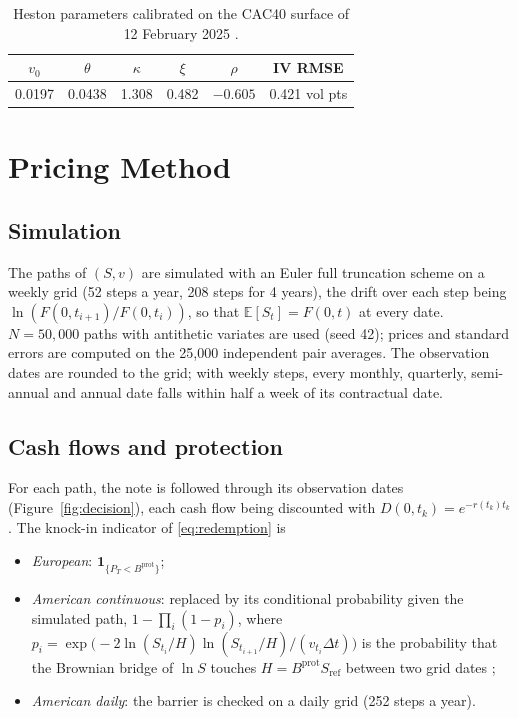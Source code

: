 \documentclass[11pt,a4paper]{article}
\newcommand{\E}{\mathbb{E}}
\newcommand{\ind}{\mathbf{1}}
\newcommand{\Sref}{S_{\mathrm{ref}}}
\begin{document}
\begin{table}[h]
\centering
\begin{tabular}{@{}cccccc@{}}
\toprule
$v_0$ & $\theta$ & $\kappa$ & $\xi$ & $\rho$ & IV RMSE \\
\midrule
0.0197 & 0.0438 & 1.308 & 0.482 & $-0.605$ & 0.421 vol pts \\
\bottomrule
\end{tabular}
\caption{Heston parameters calibrated on the CAC40 surface of 12 February 2025 \cite{benguedda2026heston}.}
\label{tab:heston}
\end{table}

\section{Pricing Method}\label{sec:method}

\subsection{Simulation}
The paths of $(S, v)$ are simulated with an Euler full truncation scheme on a weekly grid (52 steps a year,
208 steps for 4 years), the drift over each step being $\ln(F(0,t_{i+1})/F(0,t_i))$, so that
$\E[S_t] = F(0,t)$ at every date. $N = 50{,}000$ paths with antithetic variates are used (seed 42); prices and
standard errors are computed on the 25{,}000 independent pair averages. The observation dates are rounded to the
grid; with weekly steps, every monthly, quarterly, semi-annual and annual date falls within half a week of its
contractual date.

\subsection{Cash flows and protection}
For each path, the note is followed through its observation dates (Figure~\ref{fig:decision}), each cash flow
being discounted with $D(0,t_k) = e^{-r(t_k) t_k}$. The knock-in indicator of \eqref{eq:redemption} is
\begin{itemize}
\item \emph{European}: $\ind_{\{P_T < B^{\mathrm{prot}}\}}$;
\item \emph{American continuous}: replaced by its conditional probability given the simulated path,
$1 - \prod_i (1 - p_i)$, where
$p_i = \exp\!\big(-2 \ln(S_{t_i}/H) \ln(S_{t_{i+1}}/H) / (v_{t_i}\Delta t)\big)$ is the probability that the
Brownian bridge of $\ln S$ touches $H = B^{\mathrm{prot}}\Sref$ between two grid dates \cite{beaglehole1997};
\item \emph{American daily}: the barrier is checked on a daily grid (252 steps a year).
\end{itemize}
\end{document}
